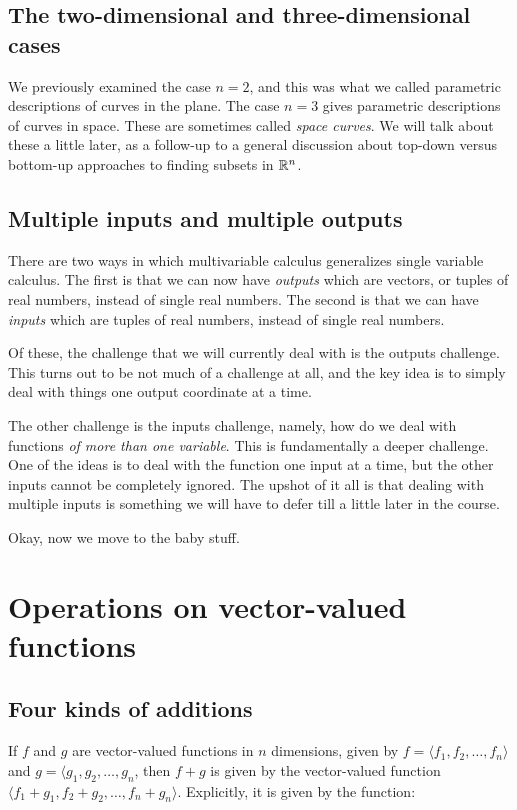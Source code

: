 \documentclass[10pt]{amsart}
\begin{document}
\subsection{The two-dimensional and three-dimensional cases}

We previously examined the case $n = 2$, and this was what we called
parametric descriptions of curves in the plane. The case $n = 3$ gives
parametric descriptions of curves in space. These are sometimes called
{\em space curves}. We will talk about these a little later, as a
follow-up to a general discussion about top-down versus bottom-up
approaches to finding subsets in $\mathbb{R}^n$.

\subsection{Multiple inputs and multiple outputs}

There are two ways in which multivariable calculus generalizes single
variable calculus. The first is that we can now have {\em outputs}
which are vectors, or tuples of real numbers, instead of single real
numbers. The second is that we can have {\em inputs} which are tuples
of real numbers, instead of single real numbers.

Of these, the challenge that we will currently deal with is the
outputs challenge. This turns out to be not much of a challenge at
all, and the key idea is to simply deal with things one output
coordinate at a time.

The other challenge is the inputs challenge, namely, how do we deal
with functions {\em of more than one variable}. This is fundamentally
a deeper challenge. One of the ideas is to deal with the function one
input at a time, but the other inputs cannot be completely
ignored. The upshot of it all is that dealing with multiple inputs is
something we will have to defer till a little later in the course.

Okay, now we move to the baby stuff.

\section{Operations on vector-valued functions}

\subsection{Four kinds of additions}

If $f$ and $g$ are vector-valued functions in $n$ dimensions,
given by $f = \langle f_1,f_2,\dots,f_n \rangle$ and $g = \langle g_1,
g_2, \dots, g_n$, then $f + g$ is given by the vector-valued function
$\langle f_1 + g_1, f_2 + g_2, \dots, f_n + g_n \rangle$. Explicitly,
it is given by the function:
\end{document}
